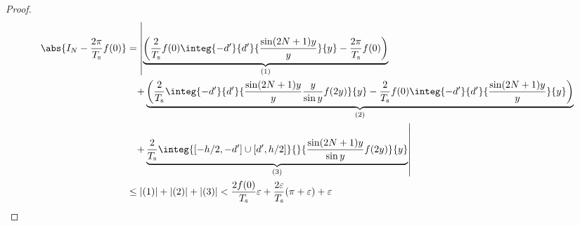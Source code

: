 \begin{proof}
					\begin{align*}
						\abs{I_N - \frac{2\pi}{T_\text{s}} f(0)} &= \left|\underbrace{\left(\frac{2}{T_\text{s}}f(0)\integ{-d'}{d'}{\frac{\sin(2N+1)y}{y}}{y} - \frac{2\pi}{T_\text{s}} f(0)\right)}_{(1)} \right. \\
						&\phantom{=} \left.+ \underbrace{\left(\frac{2}{T_\text{s}}\integ{-d'}{d'}{\frac{\sin(2N+1)y}{y}\frac{y}{\sin y}f(2y)}{y} - \frac{2}{T_\text{s}}f(0)\integ{-d'}{d'}{\frac{\sin(2N+1)y}{y}}{y}\right)}_{(2)} \right. \\
						&\phantom{=} \left.+ \underbrace{\frac{2}{T_\text{s}}\integ{[-h/2,-d']\cup[d',h/2]}{}{\frac{\sin(2N+1)y}{\sin y}f(2y)}{y}}_{(3)}\right| \\
						&\leq |(1)| + |(2)| + |(3)| < \frac{2f(0)}{T_\text{s}}\varepsilon + \frac{2\varepsilon}{T_\text{s}}(\pi+\varepsilon) + \varepsilon
					\end{align*}
				\end{proof}
